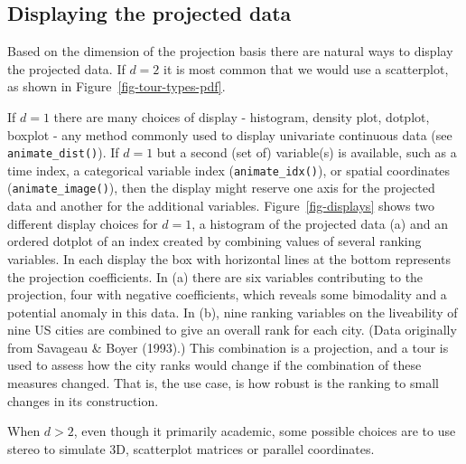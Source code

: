 \documentclass[
  letterpaper,
]{krantz}
\begin{document}
\subsection{Displaying the projected
data}\label{displaying-the-projected-data}

Based on the dimension of the projection basis there are natural ways to
display the projected data. If \(d=2\) it is most common that we would
use a scatterplot, as shown in Figure~\ref{fig-tour-types-pdf}.

If \(d=1\) there are many choices of display - histogram, density plot,
dotplot, boxplot - any method commonly used to display univariate
continuous data (see \texttt{animate\_dist()}). If \(d=1\) but a second
(set of) variable(s) is available, such as a time index, a categorical
variable index (\texttt{animate\_idx()}), or spatial coordinates
(\texttt{animate\_image()}), then the display might reserve one axis for
the projected data and another for the additional variables.
Figure~\ref{fig-displays} shows two different display choices for
\(d=1\), a histogram of the projected data (a) and an ordered dotplot of
an index created by combining values of several ranking variables. In
each display the box with horizontal lines at the bottom represents the
projection coefficients. In (a) there are six variables contributing to
the projection, four with negative coefficients, which reveals some
bimodality and a potential anomaly in this data. In (b), nine ranking
variables on the liveability of nine US cities are combined to give an
overall rank for each city. (Data originally from Savageau \& Boyer
(1993).) This combination is a projection, and a tour is used to assess
how the city ranks would change if the combination of these measures
changed. That is, the use case, is how robust is the ranking to small
changes in its construction.

When \(d>2\), even though it primarily academic, some possible choices
are to use stereo to simulate 3D, scatterplot matrices or parallel
coordinates.
\end{document}
